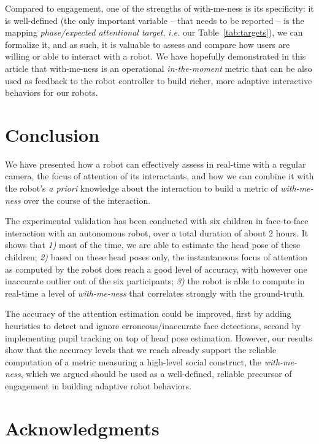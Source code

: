 \documentclass{sig-alternate}
\newcommand{\ie}{\textit{i.e.}\xspace}
\newcommand{\redacted}{\textit{\sc [REDACTED FOR REVIEW]}\xspace}
\begin{document}
Compared to engagement, one of the strengths of with-me-ness is its specificity:
it is well-defined (the only important variable -- that needs to be reported --
is the mapping {\it phase/expected attentional target}, \ie our
Table~\ref{tab:targets}), we can formalize it, and as such, it is valuable to
assess and compare how users are willing or able to interact with a robot.  We
have hopefully demonstrated in this article that with-me-ness is an operational
\emph{in-the-moment} metric that can be also used as feedback to the robot
controller to build richer, more adaptive interactive behaviors for our robots.

\section{Conclusion}

We have presented how a robot can effectively assess in real-time with a regular
camera, the focus of attention of its interactants, and how we can combine it
with the robot's {\it a priori} knowledge about the interaction to build a
metric of \emph{with-me-ness} over the course of the interaction.

The experimental validation has been conducted with six children in face-to-face
interaction with an autonomous robot, over a total duration of about 2 hours. It
shows that {\it 1)} most of the time, we are able to estimate the head pose of
these children; {\it 2)} based on these head poses only, the instantaneous focus
of attention as computed by the robot does reach a good level of accuracy, with
however one inaccurate outlier out of the six participants; {\it 3)} the robot is
able to compute in real-time a level of \emph{with-me-ness} that correlates
strongly with the ground-truth.

The accuracy of the attention estimation could be improved, first by adding
heuristics to detect and ignore erroneous/inaccurate face detections, second by
implementing pupil tracking on top of head pose estimation. However, our results
show that the accuracy levels that we reach already support the reliable
computation of a metric measuring a high-level social construct, the
\emph{with-me-ness}, which we argued should be used as a well-defined, reliable
precursor of engagement in building adaptive robot behaviors.

\section*{Acknowledgments}

\redacted



\end{document}
